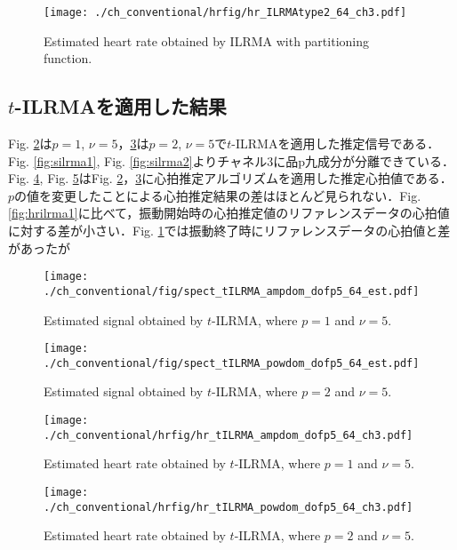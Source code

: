 \begin{figure}[tb]
\centering
\texttt{[image: ./ch\_conventional/hrfig/hr\_ILRMAtype2\_64\_ch3.pdf]}
\caption{Estimated heart rate obtained by ILRMA with partitioning function.}
\label{fig:hrilrma2}
\end{figure}

\subsection{$t$-ILRMAを適用した結果}
\label{sec:conv:resulttilrma}
Fig. \ref{fig:stilrmaa5}は$p=1$, $\nu = 5$，\ref{fig:stilrmap5}は$p=2$, $\nu = 5$で$t$-ILRMAを適用した推定信号である．Fig. \ref{fig:silrma1}, Fig. \ref{fig:silrma2}よりチャネル3に品p九成分が分離できている．Fig. \ref{fig:hrtilrmaa5}, Fig. \ref{fig:hrtilrmap5}はFig. \ref{fig:stilrmaa5}，\ref{fig:stilrmap5}に心拍推定アルゴリズムを適用した推定心拍値である．$p$の値を変更したことによる心拍推定結果の差はほとんど見られない．Fig. \ref{fig:hrilrma1}に比べて，振動開始時の心拍推定値のリファレンスデータの心拍値に対する差が小さい．Fig. \ref{fig:hrilrma2}では振動終了時にリファレンスデータの心拍値と差があったが

\begin{figure}[tb]
\centering
\texttt{[image: ./ch\_conventional/fig/spect\_tILRMA\_ampdom\_dofp5\_64\_est.pdf]}
\caption{Estimated signal obtained by $t$-ILRMA, where $p=1$ and $\nu=5$.}
\label{fig:stilrmaa5}
\end{figure}

\begin{figure}[tb]
\centering
\texttt{[image: ./ch\_conventional/fig/spect\_tILRMA\_powdom\_dofp5\_64\_est.pdf]}
\caption{Estimated signal obtained by $t$-ILRMA, where $p=2$ and $\nu=5$.}
\label{fig:stilrmap5}
\end{figure}

\begin{figure}[tb]
\centering
\texttt{[image: ./ch\_conventional/hrfig/hr\_tILRMA\_ampdom\_dofp5\_64\_ch3.pdf]}
\caption{Estimated heart rate obtained by $t$-ILRMA, where $p=1$ and $\nu=5$.}
\label{fig:hrtilrmaa5}
\end{figure}

\begin{figure}[tb]
\centering
\texttt{[image: ./ch\_conventional/hrfig/hr\_tILRMA\_powdom\_dofp5\_64\_ch3.pdf]}
\caption{Estimated heart rate obtained by $t$-ILRMA, where $p=2$ and $\nu=5$.}
\label{fig:hrtilrmap5}
\end{figure}

